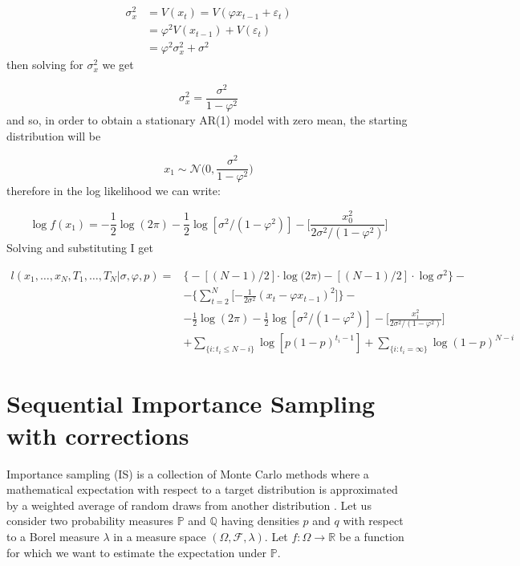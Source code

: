 \documentclass[11pt,a4paper]{article}
\newcommand{\eps}{\varepsilon}
\begin{document}
\[
\begin{split} 
\sigma_{x}^2 & = V(x_{t}) = V(\varphi x_{t-1} + \eps_{t}) \\
& = \varphi^2 V(x_{t-1}) + V(\eps_{t}) \\
& = \varphi^2 \sigma_{x}^2 + \sigma^2
\end{split}
\]
then solving for $\sigma_{x}^2$ we get

\[
\sigma_{x}^2 = \frac{\sigma^2}{1- \varphi^2}
\]
and so, in order to obtain a stationary AR(1) model with zero mean, the starting distribution will be

\[
x_{1} \sim \mathcal{N} \Bigg (0, \frac{\sigma^2}{1- \varphi^2} \Bigg )
\]
therefore in the log likelihood we can write:

\[
\log f(x_{1}) = - \frac{1}{2} \log(2 \pi) - \frac{1}{2} \log[\sigma^2 / (1 - \varphi^2)] - \Bigg [\frac{x_{0}^{2}}{2 \sigma^2/(1 - \varphi^2)} \Bigg ]
\]
Solving and substituting I get

\[
\begin{split}
l(x_{1}, \dots, x_{N} , T_{1}, \dots, T_{N} | \sigma, \varphi, p) = & \Bigg \{ -[(N - 1)/2]{ \cdot \log (2 \pi }) - [(N - 1)/2] \cdot{\log \sigma^{2}} \Bigg \} - \\
& - \Bigg \{ \sum_{t=2}^{N}  \Bigg [ { - \frac{1}{2 \sigma^{2}} }  (x_{t} - \varphi x_{t-1})^{2} \Bigg ] \Bigg \} - \\
& - \frac{1}{2} \log(2 \pi) - \frac{1}{2} \log[\sigma^2 / (1 - \varphi^2)] - \Bigg [\frac{x_{1}^{2}}{2 \sigma^2/(1 - \varphi^2)} \Bigg ] \\
& +   \sum_{\{i:t_{i} \leq N - i \}} \log [p (1 - p)^{t_{i} - 1}] + \sum_{\{i: t_{i} = \infty\}} \log (1 - p)^{N - i}
\end{split}
\]





\section{Sequential Importance Sampling with corrections}

Importance sampling (IS) is a collection of Monte Carlo methods where a mathematical expectation with respect to a target distribution is approximated by a weighted average of random draws from another distribution \cite{Tokdar}.
Let us consider two probability measures $\mathbb{P}$ and $\mathbb{Q}$ having densities $p$ and $q$ with respect to a Borel measure $\lambda$ in a measure space $(\Omega, \mathcal{F} ,\lambda)$. Let $f : \Omega \to \mathbb{R}$ be a function for which we want to estimate the expectation under $\mathbb{P}$.
\end{document}
